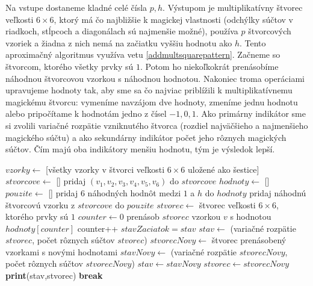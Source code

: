 \begin{alg}
\label{algsquare6x6mm}
Na vstupe dostaneme kladné celé čísla $p, h$. Výstupom je multiplikatívny štvorec veľkosti $6 \times 6$, ktorý má čo najbližšie k magickej vlastnosti (odchýlky súčtov v riadkoch, stĺpcoch a diagonálach sú najmenšie možné), používa $p$ štvorcových vzoriek a žiadna z nich nemá na začiatku vyššiu hodnotu ako $h$. Tento aproximačný algoritmus využíva vetu \ref{addmultsquarepattern}. Začneme so štvorcom, ktorého všetky prvky sú $1$. Potom ho niekoľkokrát prenásobíme náhodnou štvorcovou vzorkou s náhodnou hodnotou. Nakoniec troma operáciami upravujeme hodnoty tak, aby sme sa čo najviac priblížili k multiplikatívnemu magickému štvorcu: vymeníme navzájom dve hodnoty, zmeníme jednu hodnotu alebo pripočítame k hodnotám jedno z čísel $-1, 0, 1$. Ako primárny indikátor sme si zvolili variačné rozpätie vzniknutého štvorca (rozdiel najväčšieho a najmenšieho magického súčtu) a ako sekundárny indikátor počet jeho rôznych magických súčtov. Čím majú oba indikátory menšiu hodnotu, tým je výsledok lepší.
\end{alg}

\begin{algorithmic}
\STATE $vzorky \gets$ [všetky vzorky v štvorci veľkosti $6 \times 6$ uložené ako šestice]
\STATE $stvorcove \gets $ []
	\STATE pridaj $(v_1,v_2,v_3,v_4,v_5,v_6)$ do $stvorcove$
    \ENDIF
\ENDFOR
{}
	\STATE $hodnoty \gets$ []
	\STATE $pouzite \gets$ []
		\STATE pridaj $6$ náhodných hodnôt medzi $1$ a $h$ do $hodnoty$
		\STATE pridaj náhodnú štvorcovú vzorku z $stvorcove$ do $pouzite$
	\ENDFOR
		\STATE $stvorec \gets$ štvorec veľkosti $6 \times 6$, ktorého prvky sú $1$
		\STATE $counter \gets 0$
				\STATE prenásob $stvorec$ vzorkou $v$ s hodnotou $hodnoty[counter]$
				\STATE counter++
			\ENDFOR
		\ENDFOR
			\STATE $stavZaciatok = stav$
			\STATE $stav \gets$ (variačné rozpätie $stvorec$, počet rôznych súčtov $stvorec$)
				\STATE $stvorecNovy \gets$ štvorec prenásobený vzorkami s novými hodnotami
				\STATE $stavNovy \gets$ (variačné rozpätie $stvorecNovy$, počet rôznych súčtov $stvorecNovy$)
					\STATE $stav \gets stavNovy$
					\STATE $stvorec \gets stvorecNovy$
				\ENDIF
			\ENDFOR
				\STATE \textbf{print}(stav,stvorec)
				\STATE \textbf{break}
			\ENDIF
		\ENDIF
	\ENDWHILE
\ENDWHILE
\end{algorithmic}

